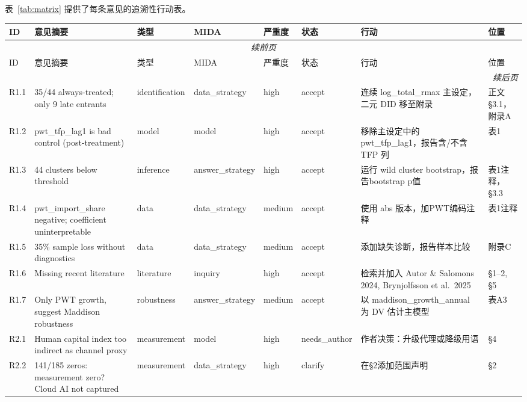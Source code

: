 \documentclass[12pt,a4paper]{ctexart}
\newcommand{\cellsevhigh}{\cellcolor{red!10}\textcolor{red!70!black}}
\newcommand{\cellsevmed}{\cellcolor{orange!10}\textcolor{orange!70!black}}
\newcommand{\cellacc}{\cellcolor{green!10}\textcolor{green!60!black}}
\newcommand{\cellna}{\cellcolor{orange!15}\textcolor{orange!80!black}}
\newcommand{\cellcl}{\cellcolor{blue!10}\textcolor{blue!70!black}}
\begin{document}
表~\ref{tab:matrix} 提供了每条意见的追溯性行动表。

\begingroup
\footnotesize
\setlength{\tabcolsep}{3.5pt}
\begin{longtable}{p{1.1cm}p{2.8cm}p{1.3cm}p{1.2cm}p{0.8cm}p{1.5cm}p{3.0cm}p{1.2cm}}
\toprule
ID & 意见摘要 & 类型 & MIDA & 严重度 & 状态 & 行动 & 位置 \\
\midrule
\endfirsthead
\multicolumn{8}{c}{\textit{续前页}}\\
\toprule
ID & 意见摘要 & 类型 & MIDA & 严重度 & 状态 & 行动 & 位置 \\
\midrule
\endhead
\midrule
\multicolumn{8}{r}{\textit{续后页}}\\
\endfoot
\bottomrule
\endlastfoot

R1.1 & 35/44 always-treated; only 9 late entrants & identification & data\_strategy & \cellsevhigh{high} & \cellacc{accept} & 连续 log\_total\_rmax 主设定，二元 DID 移至附录 & 正文§3.1，附录A \\
R1.2 & pwt\_tfp\_lag1 is bad control (post-treatment) & model & model & \cellsevhigh{high} & \cellacc{accept} & 移除主设定中的 pwt\_tfp\_lag1，报告含/不含 TFP 列 & 表1 \\
R1.3 & 44 clusters below threshold & inference & answer\_strategy & \cellsevhigh{high} & \cellacc{accept} & 运行 wild cluster bootstrap，报告bootstrap p值 & 表1注释，§3.3 \\
R1.4 & pwt\_import\_share negative; coefficient uninterpretable & data & data\_strategy & \cellsevmed{medium} & \cellacc{accept} & 使用 abs 版本，加PWT编码注释 & 表1注释 \\
R1.5 & 35\% sample loss without diagnostics & data & data\_strategy & \cellsevmed{medium} & \cellacc{accept} & 添加缺失诊断，报告样本比较 & 附录C \\
R1.6 & Missing recent literature & literature & inquiry & \cellsevhigh{high} & \cellacc{accept} & 检索并加入 Autor \& Salomons 2024, Brynjolfsson et al.\ 2025 & §1--2, §5 \\
R1.7 & Only PWT growth, suggest Maddison robustness & robustness & answer\_strategy & \cellsevmed{medium} & \cellacc{accept} & 以 maddison\_growth\_annual 为 DV 估计主模型 & 表A3 \\
R2.1 & Human capital index too indirect as channel proxy & measurement & model & \cellsevhigh{high} & \cellna{needs\_author} & 作者决策：升级代理或降级用语 & §4 \\
R2.2 & 141/185 zeros: measurement zero? Cloud AI not captured & measurement & data\_strategy & \cellsevhigh{high} & \cellcl{clarify} & 在§2添加范围声明 & §2 \\

\end{longtable}
\end{document}
